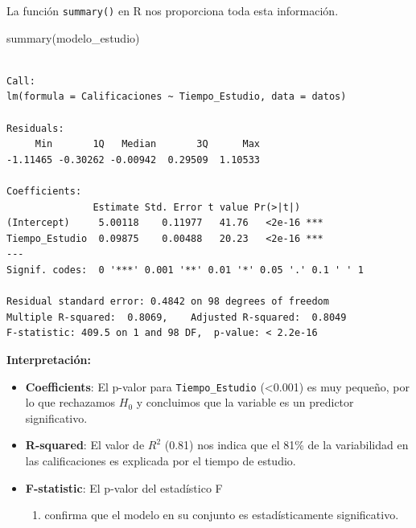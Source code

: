 \documentclass[
  letterpaper,
  DIV=11,
  numbers=noendperiod]{scrreprt}
\newenvironment{Shaded}{\begin{snugshade}}{\end{snugshade}}
\newcommand{\FunctionTok}[1]{\textcolor[rgb]{0.28,0.35,0.67}{#1}}
\newcommand{\NormalTok}[1]{\textcolor[rgb]{0.00,0.23,0.31}{#1}}
\providecommand{\tightlist}{%
  \setlength{\itemsep}{0pt}\setlength{\parskip}{0pt}}
\begin{document}
\begin{tcolorbox}[enhanced jigsaw, breakable, toprule=.15mm, bottomtitle=1mm, coltitle=black, colbacktitle=quarto-callout-tip-color!10!white, titlerule=0mm, opacitybacktitle=0.6, bottomrule=.15mm, toptitle=1mm, title=\textcolor{quarto-callout-tip-color}{\faLightbulb}\hspace{0.5em}{Ejemplo: Interpretación del \texttt{summary}}, arc=.35mm, rightrule=.15mm, opacityback=0, colframe=quarto-callout-tip-color-frame, leftrule=.75mm, left=2mm, colback=white]

La función \texttt{summary()} en R nos proporciona toda esta
información.

\begin{Shaded}
\begin{Highlighting}[]
\FunctionTok{summary}\NormalTok{(modelo\_estudio)}
\end{Highlighting}
\end{Shaded}

\begin{verbatim}

Call:
lm(formula = Calificaciones ~ Tiempo_Estudio, data = datos)

Residuals:
     Min       1Q   Median       3Q      Max 
-1.11465 -0.30262 -0.00942  0.29509  1.10533 

Coefficients:
               Estimate Std. Error t value Pr(>|t|)    
(Intercept)     5.00118    0.11977   41.76   <2e-16 ***
Tiempo_Estudio  0.09875    0.00488   20.23   <2e-16 ***
---
Signif. codes:  0 '***' 0.001 '**' 0.01 '*' 0.05 '.' 0.1 ' ' 1

Residual standard error: 0.4842 on 98 degrees of freedom
Multiple R-squared:  0.8069,    Adjusted R-squared:  0.8049 
F-statistic: 409.5 on 1 and 98 DF,  p-value: < 2.2e-16
\end{verbatim}

\textbf{Interpretación:}

\begin{itemize}
\tightlist
\item
  \textbf{Coefficients}: El p-valor para \texttt{Tiempo\_Estudio}
  (\textless0.001) es muy pequeño, por lo que rechazamos \(H_0\) y
  concluimos que la variable es un predictor significativo.
\item
  \textbf{R-squared}: El valor de \(R^2\) (0.81) nos indica que el 81\%
  de la variabilidad en las calificaciones es explicada por el tiempo de
  estudio.
\item
  \textbf{F-statistic}: El p-valor del estadístico F

  \begin{enumerate}
  \def\labelenumi{(\arabic{enumi})}
  \setcounter{enumi}{97}
  \tightlist
  \item
    confirma que el modelo en su conjunto es estadísticamente
    significativo.
  \end{enumerate}
\end{itemize}

\end{tcolorbox}
\end{document}
